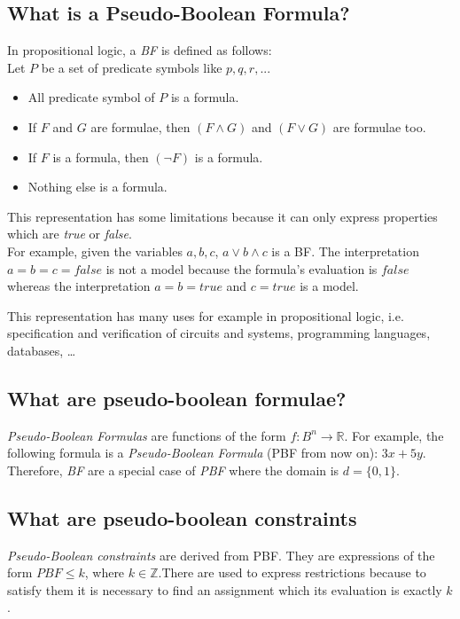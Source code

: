 \subsection{What is a Pseudo-Boolean Formula?}
In propositional logic, a \emph{BF} is defined as follows\cite{Lpo}:\\
Let $P$ be a set of predicate symbols like $p,q,r,...$
\begin{itemize}
	\item All predicate symbol of $P$ is a formula.
	\item If $F$ and $G$ are formulae, then $(F \land G)$ and $(F \lor G)$ are formulae too.
	\item If $F$ is a formula, then $(\neg F)$ is a formula.
	\item Nothing else is a formula.
\end{itemize}
This representation has some limitations because it can only express properties which are \emph{true} or \emph{false}.\\

For example, given the variables $a,b,c$, $a \vee b \wedge c$ is a BF. The interpretation $a = b =c = false$ is not a model because the formula's evaluation is $false$ whereas the interpretation $a = b = true $ and $c=true$ is a model.

This representation has many uses for example in propositional logic, i.e. specification and verification of circuits and systems, programming languages, databases, \ldots


\subsection{What are pseudo-boolean formulae?}

\emph{Pseudo-Boolean Formulas} are functions of the form $f:B^n \rightarrow \mathbb{R}$. For example, the following formula is a \emph{Pseudo-Boolean Formula} (PBF from now on): $3x+5y$. Therefore, \emph{BF} are a special case of \emph{PBF} where the domain is $d=\{0,1\}$.\\

\subsection{What are pseudo-boolean constraints}
\emph{Pseudo-Boolean constraints} are derived from PBF. They are expressions of the form $PBF \leq k$, where $k\in \mathbb{Z}$.There are used to express restrictions because to satisfy them it is necessary to find an assignment which its evaluation is exactly $k$.

